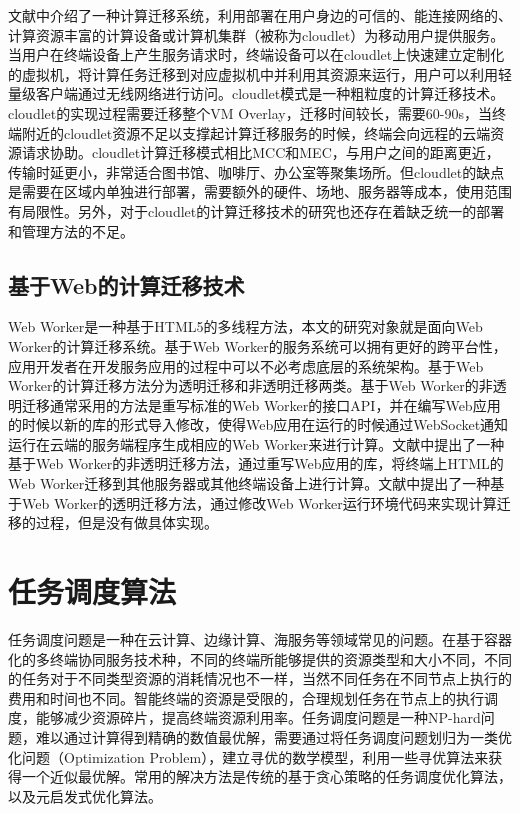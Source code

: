文献\cite{satyanarayanan2009case}中介绍了一种计算迁移系统，利用部署在用户身边的可信的、能连接网络的、计算资源丰富的计算设备或计算机集群（被称为cloudlet）为移动用户提供服务。当用户在终端设备上产生服务请求时，终端设备可以在cloudlet上快速建立定制化的虚拟机，将计算任务迁移到对应虚拟机中并利用其资源来运行，用户可以利用轻量级客户端通过无线网络进行访问\cite{verbelen2012cloudlets}。cloudlet模式是一种粗粒度的计算迁移技术\cite{谢人超2018移动边缘计算卸载技术综述}。cloudlet的实现过程需要迁移整个VM Overlay，迁移时间较长，需要60-90s，当终端附近的cloudlet资源不足以支撑起计算迁移服务的时候，终端会向远程的云端资源请求协助\cite{张文丽2016智能移动终端计算迁移研究}。cloudlet计算迁移模式相比MCC和MEC，与用户之间的距离更近，传输时延更小，非常适合图书馆、咖啡厅、办公室等聚集场所。但cloudlet的缺点是需要在区域内单独进行部署，需要额外的硬件、场地、服务器等成本，使用范围有局限性\cite{li2014can,zhang2018hybrid}。另外，对于cloudlet的计算迁移技术的研究也还存在着缺乏统一的部署和管理方法的不足\cite{张文丽2016智能移动终端计算迁移研究}。
\subsection{基于Web的计算迁移技术}
Web Worker是一种基于HTML5的多线程方法，本文的研究对象就是面向Web Worker的计算迁移系统。基于Web Worker的服务系统可以拥有更好的跨平台性，应用开发者在开发服务应用的过程中可以不必考虑底层的系统架构\cite{王硕2016嵌入式}。基于Web Worker的计算迁移方法分为透明迁移和非透明迁移两类\cite{wang2018html5}。基于Web Worker的非透明迁移通常采用的方法是重写标准的Web Worker的接口API，并在编写Web应用的时候以新的库的形式导入修改，使得Web应用在运行的时候通过WebSocket通知运行在云端的服务端程序生成相应的Web Worker来进行计算\cite{zbierski2014bring,hwang2014wwf,hwang2014cloud,gong2016wwof,kurumatani2012executing}。文献\cite{王昭2018Web}中提出了一种基于Web Worker的非透明迁移方法，通过重写Web应用的库，将终端上HTML的Web Worker迁移到其他服务器或其他终端设备上进行计算。文献\cite{zhang2010elastic}中提出了一种基于Web Worker的透明迁移方法，通过修改Web Worker运行环境代码来实现计算迁移的过程，但是没有做具体实现。

\section{任务调度算法}\label{sec:related_work_task_scheduling}
任务调度问题是一种在云计算\cite{qiao2016efficient}、边缘计算\cite{guo2017energy}、海服务\cite{王劲林2015一种现场}等领域常见的问题。在基于容器化的多终端协同服务技术种，不同的终端所能够提供的资源类型和大小不同，不同的任务对于不同类型资源的消耗情况也不一样，当然不同任务在不同节点上执行的费用和时间也不同。智能终端的资源是受限的，合理规划任务在节点上的执行调度，能够减少资源碎片，提高终端资源利用率\cite{huang2013energy,tseng2014effective,马晓光2017一种适用于}。任务调度问题是一种NP-hard问题\cite{tawfeek2013cloud}，难以通过计算得到精确的数值最优解，需要通过将任务调度问题划归为一类优化问题（Optimization Problem），建立寻优的数学模型，利用一些寻优算法来获得一个近似最优解。常用的解决方法是传统的基于贪心策略的任务调度优化算法，以及元启发式优化算法。


